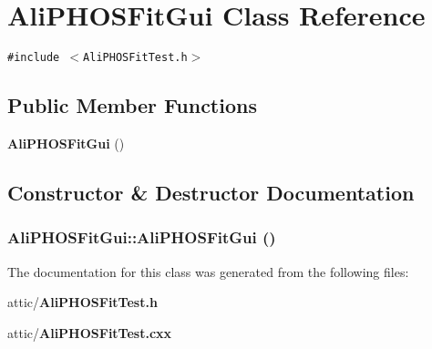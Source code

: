 \section{Ali\-PHOSFit\-Gui Class Reference}
\label{classAliPHOSFitGui}
{\tt \#include $<$Ali\-PHOSFit\-Test.h$>$}

\subsection*{Public Member Functions}
\begin{CompactItemize}
\item 
{\bf Ali\-PHOSFit\-Gui} ()
\end{CompactItemize}


\subsection{Constructor \& Destructor Documentation}
\subsubsection{\setlength{\rightskip}{0pt plus 5cm}Ali\-PHOSFit\-Gui::Ali\-PHOSFit\-Gui ()}\label{classAliPHOSFitGui_a0}




The documentation for this class was generated from the following files:\begin{CompactItemize}
\item 
attic/{\bf Ali\-PHOSFit\-Test.h}\item 
attic/{\bf Ali\-PHOSFit\-Test.cxx}\end{CompactItemize}
